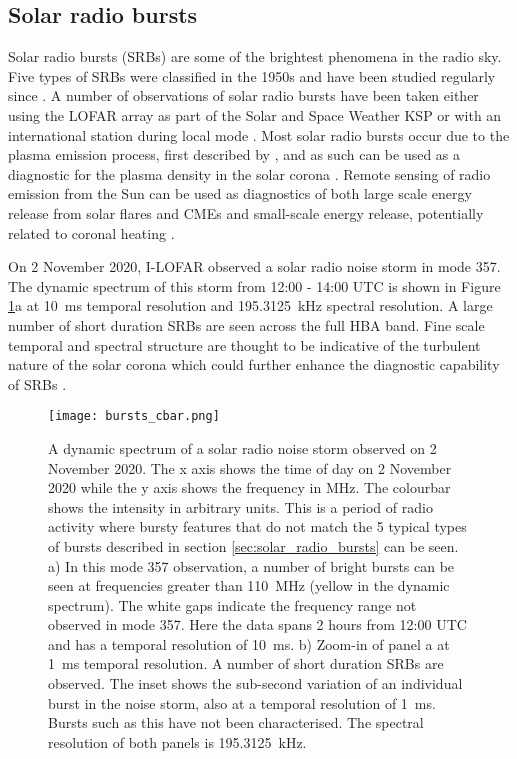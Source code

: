 \subsection{Solar radio bursts}
Solar radio bursts (SRBs) are some of the brightest phenomena in the radio sky. Five types of SRBs were classified in the 1950s \citep{Wild1950b, Boischot1957, Wild1959} and have been studied regularly since \citep[See][for a comprehensive review]{Pick2008}. A number of observations of solar radio bursts have been taken either using the LOFAR array as part of the Solar and Space Weather KSP \citep[for example,][]{Zhang2020, Murphy2021} or with an international station during local mode \citep[for example,][]{Morosan2019, Maguire2020, Bartosz2020}. Most solar radio bursts occur due to the plasma emission process, first described by \cite{Ginzburg1958}, and as such can be used as a diagnostic for the plasma density in the solar corona \citep{Melrose1987}. Remote sensing of radio emission from the Sun can be used as diagnostics of both large scale energy release from solar flares and CMEs \citep{Carley2021} and small-scale energy release, potentially related to coronal heating \citep{Mondal2020}.

On 2 November 2020, I-LOFAR observed a solar radio noise storm in mode 357. The dynamic spectrum of this storm from 12:00 - 14:00 UTC is shown in Figure \ref{fig:357_10ms}a at 10~ms temporal resolution and \SI{195.3125}{\kilo \hertz} spectral resolution. A large number of short duration SRBs are seen across the full HBA band. Fine scale temporal and spectral structure are thought to be indicative of the turbulent nature of the solar corona which could further enhance the diagnostic capability of SRBs \citep{Kolotkov2018, Sharykin2018, Reid2021}.

\begin{figure}
    \centering
    \texttt{[image: bursts\_cbar.png]}
    \caption[Solar radio noise storm observed on 2 November 2020.]{A dynamic spectrum of a solar radio noise storm observed on 2 November 2020. The x axis shows the time of day on 2 November 2020 while the y axis shows the frequency in MHz. The colourbar shows the intensity in arbitrary units. This is a period of radio activity where bursty features that do not match the 5 typical types of bursts described in section \ref{sec:solar_radio_bursts} can be seen. a) In this mode 357 observation, a number of bright bursts can be seen at frequencies greater than 110~MHz (yellow in the dynamic spectrum). The white gaps indicate the frequency range not observed in mode 357.%
    Here the data spans 2 hours from 12:00 UTC and has a temporal resolution of 10~ms.
    b) Zoom-in of panel a at 1~ms temporal resolution. A number of short duration SRBs are observed. The inset shows the sub-second variation of an individual burst in the noise storm, also at a temporal resolution of 1~ms. Bursts such as this have not been characterised. The spectral resolution of both panels is 195.3125~kHz.}
    \label{fig:357_10ms}
\end{figure}

